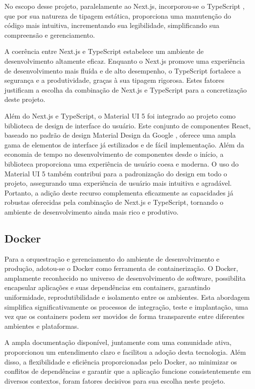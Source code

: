 No escopo desse projeto, paralelamente ao Next.js, incorporou-se o TypeScript \cite{typescriptLang}, que por sua natureza de tipagem estática, proporciona uma manutenção do código mais intuitiva, incrementando sua legibilidade, simplificando sua compreensão e gerenciamento.

A coerência entre Next.js e TypeScript estabelece um ambiente de desenvolvimento altamente eficaz. Enquanto o Next.js promove uma experiência de desenvolvimento mais fluída e de alto desempenho, o TypeScript fortalece a segurança e a produtividade, graças à sua tipagem rigorosa. Estes fatores justificam a escolha da combinação de Next.js e TypeScript para a concretização deste projeto.

Além do Next.js e TypeScript, o Material UI 5 \cite{muiDocs} foi integrado ao projeto como biblioteca de design de interface do usuário. Este conjunto de componentes React, baseado no padrão de design Material Design da Google \cite{m3Docs}, oferece uma ampla gama de elementos de interface já estilizados e de fácil implementação. Além da economia de tempo no desenvolvimento de componentes desde o início, a biblioteca proporciona uma experiência de usuário coesa e moderna. O uso do Material UI 5 também contribui para a padronização do design em todo o projeto, assegurando uma experiência de usuário mais intuitiva e agradável. Portanto, a adição deste recurso complementa eficazmente as capacidades já robustas oferecidas pela combinação de Next.js e TypeScript, tornando o ambiente de desenvolvimento ainda mais rico e produtivo.

\subsection{Docker}
Para a orquestração e gerenciamento do ambiente de desenvolvimento e produção, adotou-se o Docker \cite{dockerDocs} como ferramenta de containerização. O Docker, amplamente reconhecido no universo de desenvolvimento de software, possibilita encapsular aplicações e suas dependências em containers, garantindo uniformidade, reprodutibilidade e isolamento entre os ambientes. Esta abordagem simplifica significativamente os processos de integração, teste e implantação, uma vez que os containers podem ser movidos de forma transparente entre diferentes ambientes e plataformas.

A ampla documentação disponível, juntamente com uma comunidade ativa, proporcionou um entendimento claro e facilitou a adoção desta tecnologia. Além disso, a flexibilidade e eficiência proporcionadas pelo Docker, ao minimizar os conflitos de dependências e garantir que a aplicação funcione consistentemente em diversos contextos, foram fatores decisivos para sua escolha neste projeto.

